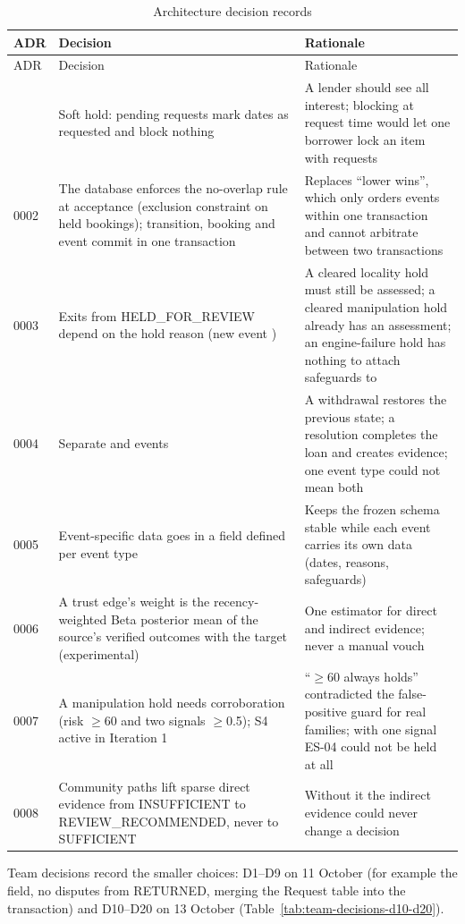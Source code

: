 \begingroup
\begin{longtable}{@{}L{34pt}L{137pt}L{204pt}@{}}
\caption{Architecture decision records}\label{tab:architecture-decision-records}\\
\toprule
ADR & Decision & Rationale \\
\midrule
\endfirsthead
\toprule
ADR & Decision & Rationale \\
\midrule
\endhead
\bottomrule
{} & Soft hold: pending requests mark dates as requested and block nothing & A lender should see all interest; blocking at request time would let one borrower lock an item with requests \\
0002 & The database enforces the no-overlap rule at acceptance (exclusion constraint on held bookings); transition, booking and event commit in one transaction & Replaces ``lower  wins'', which only orders events within one transaction and cannot arbitrate between two transactions \\
0003 & Exits from HELD\_FOR\_REVIEW depend on the hold reason (new event ) & A cleared locality hold must still be assessed; a cleared manipulation hold already has an assessment; an engine-failure hold has nothing to attach safeguards to \\
0004 & Separate  and  events & A withdrawal restores the previous state; a resolution completes the loan and creates evidence; one event type could not mean both \\
0005 & Event-specific data goes in a  field defined per event type & Keeps the frozen schema stable while each event carries its own data (dates, reasons, safeguards) \\
0006 & A trust edge's weight is the recency-weighted Beta posterior mean of the source's verified outcomes with the target (experimental) & One estimator for direct and indirect evidence; never a manual vouch \\
0007 & A manipulation hold needs corroboration (risk $\geq$60 and two signals $\geq$0.5); S4 active in Iteration 1 & ``$\geq$60 always holds'' contradicted the false-positive guard for real families; with one signal ES-04 could not be held at all \\
0008 & Community paths lift sparse direct evidence from INSUFFICIENT to REVIEW\_RECOMMENDED, never to SUFFICIENT & Without it the indirect evidence could never change a decision \\
\end{longtable}
\endgroup
Team decisions record the smaller choices: D1--D9 on 11 October (for example the  field, no disputes from RETURNED, merging the Request table into the transaction) and D10--D20 on 13 October (Table~\ref{tab:team-decisions-d10-d20}).

